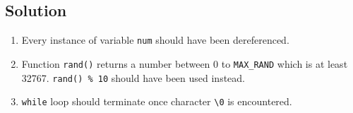 
\subsection*{Solution}

\begin{enumerate}

\item
Every instance of variable \texttt{num} should have been dereferenced.
\lstset{language=c,tabsize=4}


\item
Function \texttt{rand()} returns a number between 0 to \texttt{MAX\_RAND} which is at least 32767.
\texttt{rand() \% 10} should have been used instead.
\lstset{language=c,tabsize=4}



\item
\texttt{while} loop should terminate once character \texttt{\textbackslash 0} is encountered.
\lstset{language=c,tabsize=4}


\end{enumerate}
